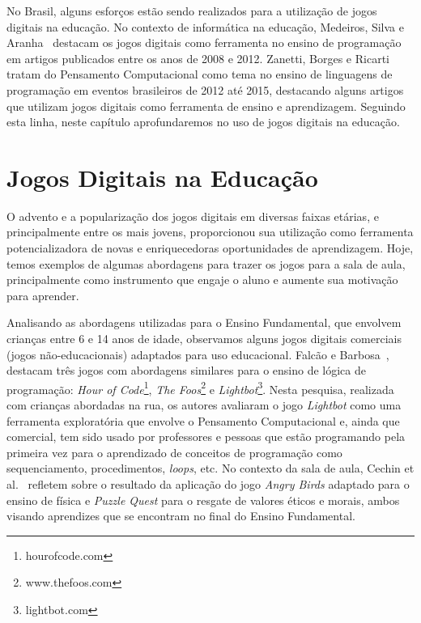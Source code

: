 No Brasil, alguns esforços estão sendo realizados para a utilização de jogos digitais na educação. No contexto de informática na educação, Medeiros, Silva e Aranha~\cite{medeiros_ensino_2013} destacam os jogos digitais como ferramenta no ensino de programação em artigos publicados entre os anos de 2008 e 2012. Zanetti, Borges e Ricarti~\cite{zanetti_pensamento_2016} tratam do Pensamento Computacional como tema no ensino de linguagens de programação em eventos brasileiros de 2012 até 2015, destacando alguns artigos que utilizam jogos digitais como ferramenta de ensino e aprendizagem. Seguindo esta linha, neste capítulo aprofundaremos no uso de jogos digitais na educação.


\section{Jogos Digitais na Educação} \label{sec:jogos_digiais_utilizacao}

O advento e a popularização dos jogos digitais em diversas faixas etárias, e principalmente entre os mais jovens, proporcionou sua utilização como ferramenta potencializadora de novas e enriquecedoras oportunidades de aprendizagem. Hoje, temos exemplos de algumas abordagens para trazer os jogos para a sala de aula, principalmente como instrumento que engaje o aluno e aumente sua motivação para aprender.

Analisando as abordagens utilizadas para o Ensino Fundamental, que envolvem crianças entre 6 e 14 anos de idade, observamos alguns jogos digitais comerciais (jogos não-educacionais) adaptados para uso educacional. Falcão e Barbosa~\cite{falcao_aperta_2015}, destacam três jogos com abordagens similares para o ensino de lógica de programação: \textit{Hour of Code}\footnote{hourofcode.com}, \textit{The Foos}\footnote{www.thefoos.com} e \textit{Lightbot}\footnote{lightbot.com}. Nesta pesquisa, realizada com crianças abordadas na rua, os autores avaliaram o jogo \textit{Lightbot} como uma ferramenta exploratória que envolve o Pensamento Computacional e, ainda que comercial, tem sido usado por professores e pessoas que estão programando pela primeira vez para o aprendizado de conceitos de programação como sequenciamento, procedimentos, \textit{loops}, etc. No contexto da sala de aula, Cechin et al.~\cite{cechin_adaptacao_2012} refletem sobre o resultado da aplicação do jogo \textit{Angry Birds} adaptado para o ensino de física e \textit{Puzzle Quest} para o resgate de valores éticos e morais, ambos visando aprendizes que se encontram no final do Ensino Fundamental.

